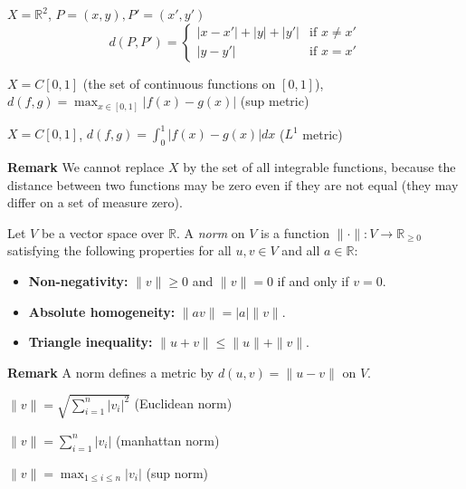 \documentclass[main.tex]{subfiles}
\begin{document}
\begin{example}
    $X = \mathbb{R}^2$, $P = (x, y), P' = (x', y')$ \[ d(P, P') = \begin{cases} 
    |x - x'| + |y| + |y'|   &  \text{if } x \neq x' \\
    |y - y'|   &  \text{if } x = x'  
   \end{cases}
\]
\end{example}

\begin{example}
    $X = C[0, 1]$ (the set of continuous functions on $[0, 1]$), $d(f, g) = \max_{x \in [0, 1]} |f(x) - g(x)|$ (sup metric) 
\end{example}

\begin{example}
    $X = C[0, 1]$, $d(f, g) = \int_0^1 |f(x) - g(x)| dx$ ($L^1$ metric)
\end{example}

\par \noindent \textbf{Remark} We cannot replace $X$ by the set of all integrable functions, because the distance between two functions may be zero even if they are not equal (they may differ on a set of measure zero). 

\begin{definition}
    Let $V$ be a vector space over $\mathbb{R}$. A \emph{norm} on $V$ is a function $\|\cdot\|: V \to \mathbb{R}_{\ge 0}$ satisfying the following properties for all $u, v \in V$ and all $a \in \mathbb{R}$:  
\begin{itemize}
    \item \textbf{Non-negativity:} $\|v\| \ge 0$ and $\|v\| = 0$ if and only if $v = 0$.
    \item \textbf{Absolute homogeneity:} $\|av\| = |a|\|v\|$.
    \item \textbf{Triangle inequality:} $\|u + v\| \le \|u\| + \|v\|$.
\end{itemize} 
\end{definition}

\par \noindent \textbf{Remark} A norm defines a metric by $d(u, v) = \|u - v\|$ on $V$. 

\begin{example}
    $\|v\| = \sqrt{\sum_{i=1}^n |v_i|^2}$ (Euclidean norm) 
\end{example}
\begin{example}
    $\|v\| = \sum_{i=1}^n |v_i|$ (manhattan norm)
\end{example}
\begin{example}
    $\|v\| = \max_{1 \le i \le n} |v_i|$ (sup norm)
\end{example}
\end{document}
